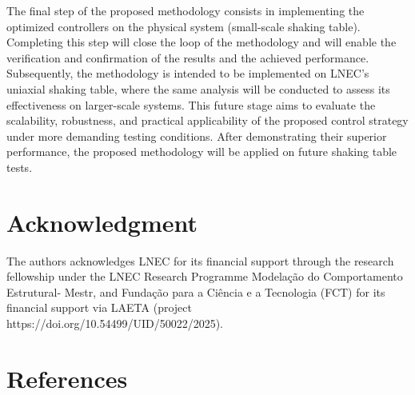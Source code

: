 \documentclass[conference]{IEEEtran}
\begin{document}
The final step of the proposed methodology consists in implementing the optimized controllers on the physical system (small-scale shaking table). Completing this step will close the loop of the methodology and will enable the verification and confirmation of the results and the achieved performance. Subsequently, the methodology is intended to be implemented on LNEC's uniaxial shaking table, where the same analysis will be conducted to assess its effectiveness on larger-scale systems. This future stage aims to evaluate the scalability, robustness, and practical applicability of the proposed control strategy under more demanding testing conditions. After demonstrating their superior performance, the proposed methodology will be applied on future shaking table tests.


\section*{Acknowledgment}
The authors acknowledges LNEC for its financial support through the research fellowship under the LNEC Research Programme Modelação do Comportamento Estrutural- Mestr, and Fundação para a Ciência e a Tecnologia (FCT) for its financial support via LAETA (project https://doi.org/10.54499/UID/50022/2025).

\section*{References}



\end{document}
